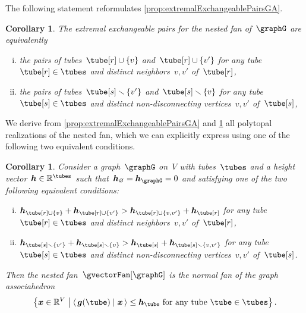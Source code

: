 \documentclass{amsart}
\newtheorem{corollary}[theorem]{Corollary}
\theoremstyle{definition}
\newcommand{\R}{\mathbb{R}} %
\renewcommand{\b}[1]{{\boldsymbol{#1}}} %
\newcommand{\set}[2]{\left\{ #1 \;\middle|\; #2 \right\}} %
\newcommand{\ssm}{\smallsetminus} %
\newcommand{\dotprod}[2]{\left\langle \, #1 \; \middle| \; #2 \, \right\rangle} %
\newcommand{\gvector}[1]{\b{g}(#1)} %
\newcommand{\ground}{V} %
\newcommand{\connectedComponents}{\kappa} %
\begin{document}
The following statement reformulates \cref{prop:extremalExchangeablePairsGA}.

\begin{corollary}
\label{coro:extremalExchangeablePairsGA}
The extremal exchangeable pairs for the nested fan of~$\graphG$ are equivalently
\begin{enumerate}[(i)]
\item the pairs of tubes~$\tube[r] \cup \{v\}$ and~$\tube[r] \cup \{v'\}$ for any tube~$\tube[r] \in \tubes$ and distinct neighbors~$v,v'$ of~$\tube[r]$,
\item the pairs of tubes~$\tube[s] \ssm \{v'\}$ and~$\tube[s] \ssm \{v\}$ for any tube~$\tube[s] \in \tubes$ and distinct non-disconnecting vertices~$v,v'$ of~$\tube[s]$,
\end{enumerate}
\end{corollary}

We derive from \cref{prop:extremalExchangeablePairsGA} and \cref{coro:extremalExchangeablePairsGA} all polytopal realizations of the nested fan, which we can explicitly express using one of the following two equivalent conditions.


\begin{corollary}
Consider a graph~$\graphG$ on~$\ground$ with tubes~$\tubes$ and a height vector~$\b{h} \in \R^{\tubes}$ such that~$\b{h}_{\varnothing} = \b{h}_{\graphG} = 0$ and satisfying one of the two following equivalent conditions:
\begin{enumerate}[(i)]
\item $\b{h}_{\tube[r] \cup \{v\}} + \b{h}_{\tube[r] \cup \{v'\}} > \b{h}_{\tube[r] \cup \{v, v'\}} + \b{h}_{\tube[r]}$ for any tube~$\tube[r] \in \tubes$ and distinct neighbors~$v,v'$ of~$\tube[r]$,
\item $\b{h}_{\tube[s] \ssm \{v'\}} + \b{h}_{\tube[s] \ssm \{v\}} > \b{h}_{\tube[s]} + \b{h}_{\tube[s] \ssm \{v, v'\}}$ for any tube~$\tube[s] \in \tubes$ and distinct non-disconnecting vertices~$v,v'$ of~$\tube[s]$.
\end{enumerate}
Then the nested fan~$\gvectorFan[\graphG]$ is the normal fan of the graph associahedron
\[
\set{\b{x} \in \R^\ground}{\dotprod{\gvector{\tube}}{\b{x}} \le \b{h}_{\tube} \text{ for any tube } \tube \in \tubes}.
\]
\end{corollary}
\end{document}

